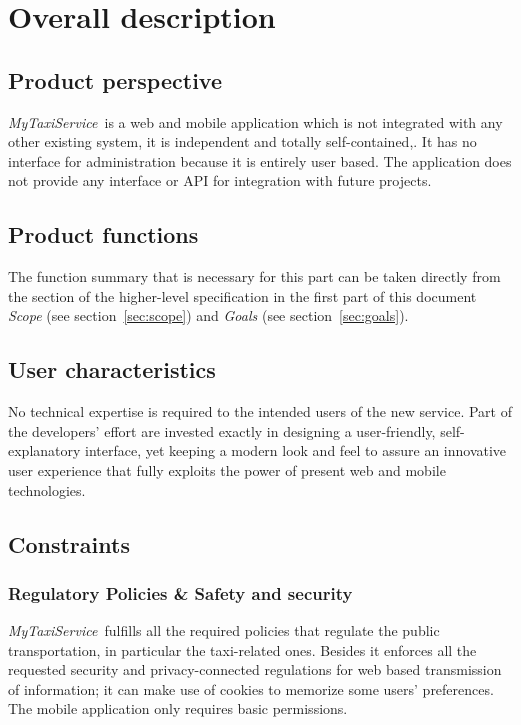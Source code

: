 \documentclass[a4paper,11pt]{report} %
\newcommand{\mts}{\mbox{\normalfont\itshape MyTaxiService\ }}
\begin{document}
	\pagebreak %
	
	\section{Overall description}
	
	\subsection{Product perspective} \mts is a web and mobile application which is not integrated with	any other existing system, it is independent and totally self-contained,. It has no interface for administration because it is entirely user based. The application does not provide any interface or API for integration with future projects.
	
	\subsection{Product functions} The function summary that is necessary for this part can be taken directly from the section of the higher-level specification in the first part of this document {\em Scope} (see section~\ref{sec:scope}) and {\em Goals} (see section~\ref{sec:goals}).
	
	\subsection{User characteristics} No technical expertise is required to the intended users of the new service. Part of the developers' effort are invested exactly in designing a user-friendly, self-explanatory interface, yet keeping a modern look and feel to assure an innovative user experience that fully exploits the power of present web and mobile technologies.  
	
	\subsection{Constraints}
	
	\subsubsection{Regulatory Policies \& Safety and security} \mts fulfills all the required policies that regulate the public transportation, in particular the taxi-related ones. Besides it enforces all the requested security and privacy-connected regulations for web based transmission of information; it can make use of cookies to memorize some users' preferences. The mobile application only requires basic permissions.
	
\end{document}
